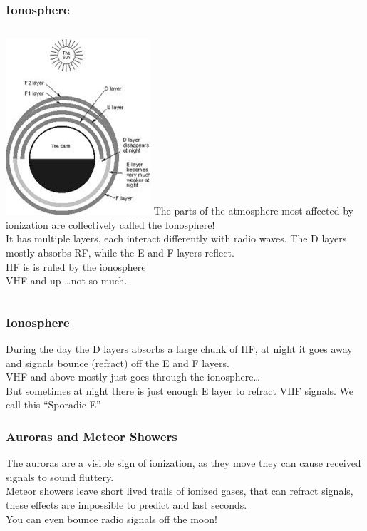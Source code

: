 \documentclass[10pt]{beamer}
\begin{document}
\begin{frame}
\frametitle{Ionosphere}
\begin{columns}
\includegraphics[height=.9\textheight]{ionosphere.png}
The parts of the atmosphere most affected by ionization are collectively called the Ionosphere!\\
It has multiple layers, each interact differently with radio waves. The D layers mostly absorbs RF, while the E and F layers reflect.\\
HF is is ruled by the ionosphere\\ VHF and up \ldots not so much.
\end{columns}
\end{frame}

\begin{frame}
\frametitle{Ionosphere}
During the day the D layers absorbs a large chunk of HF, at night it goes away and signals bounce (refract) off the E and F layers.\\
VHF and above mostly just goes through the ionosphere\ldots\\
But sometimes at night there is just enough E layer to refract VHF signals. We call this ``Sporadic E''
\end{frame}

\begin{frame}
\frametitle{Auroras and Meteor Showers}
The auroras are a visible sign of ionization, as they move they can cause received signals to sound fluttery.\\
Meteor showers leave short lived trails of ionized gases, that can refract signals, these effects are impossible to predict and last seconds.\\
You can even bounce radio signals off the moon!
\end{frame}
\end{document}
